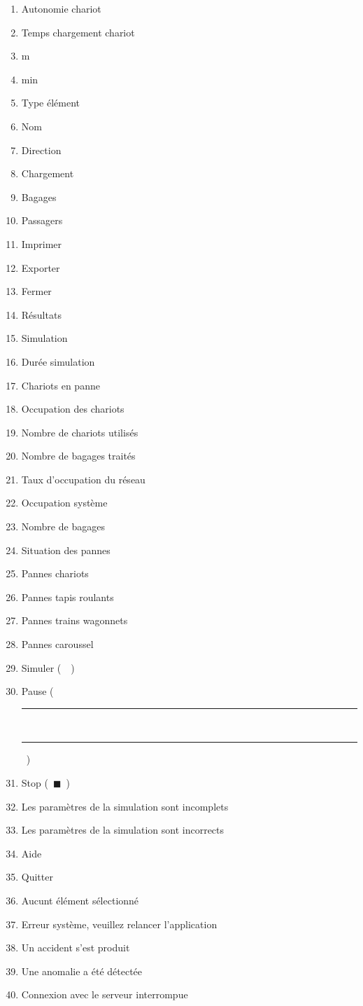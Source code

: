 \begin{enumerate}
	\item Autonomie chariot
	\item Temps chargement chariot
	\item m
	\item min
	\item Type élément
	\item Nom
	\item Direction
	\item Chargement
	\item Bagages
	\item Passagers
	\item Imprimer
	\item Exporter
	\item Fermer
	\item Résultats
	\item Simulation
	\item Durée simulation
	\item Chariots en panne
	\item Occupation des chariots
	\item Nombre de chariots utilisés
	\item Nombre de bagages traités
	\item Taux d'occupation du réseau
	\item Occupation système
	\item Nombre de bagages
	\item Situation des pannes
	\item Pannes chariots
	\item Pannes tapis roulants
	\item Pannes trains wagonnets
	\item Pannes caroussel
	\item Simuler (~~)
	\item Pause (~\rule[-1pt]{2pt}{0.8em}~\rule[-1pt]{2pt}{0.8em}~)
	\item Stop (~$\blacksquare$~)
	\item Les paramètres de la simulation sont incomplets
	\item Les paramètres de la simulation sont incorrects
	\item Aide
	\item Quitter
	\item Aucunt élément sélectionné
	\item Erreur système, veuillez relancer l'application
	\item Un accident s'est produit
	\item Une anomalie a été détectée
	\item Connexion avec le serveur interrompue
\end{enumerate}
